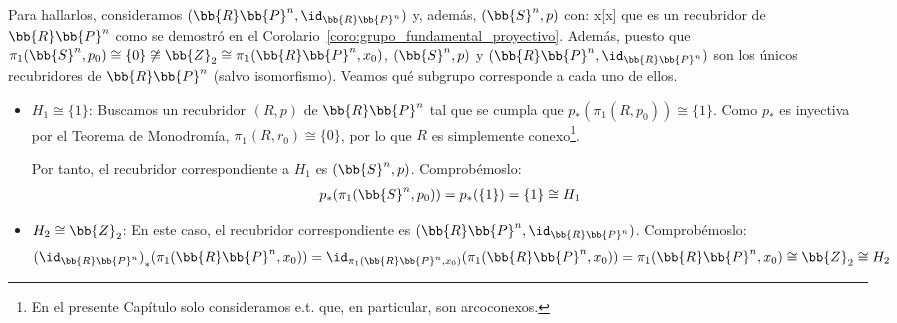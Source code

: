 \begin{ejemplo}
\begin{enumerate}
        Para hallarlos, consideramos $(\bb{R}\bb{P}^n, \id_{\bb{R}\bb{P}^n})$ y, además, $(\bb{S}^n, p)$ con:
            {x}{[x]}
        que es un recubridor de $\bb{R}\bb{P}^n$ como se demostró en el Corolario~\ref{coro:grupo_fundamental_proyectivo}. Además, puesto que $\pi_1(\bb{S}^n, p_0) \cong \{0\}\not\cong \bb{Z}_2\cong \pi_1(\bb{R}\bb{P}^n, x_0)$, $(\bb{S}^n, p)$ y $(\bb{R}\bb{P}^n, \id_{\bb{R}\bb{P}^n})$ son los únicos recubridores de $\bb{R}\bb{P}^n$ (salvo isomorfismo). Veamos qué subgrupo corresponde a cada uno de ellos.
        
        \begin{itemize}
            \item \ul{$H_1\cong \{1\}$}: Buscamos un recubridor $(R,p)$ de $\bb{R}\bb{P}^n$ tal que se cumpla que $p_*(\pi_1(R,p_0)) \cong \{1\}$. Como $p_*$ es inyectiva por el Teorema de Monodromía, $\pi_1(R,r_0) \cong \{0\}$, por lo que $R$ es simplemente conexo\footnote{En el presente Capítulo solo consideramos e.t. que, en particular, son arcoconexos.}.
            
            Por tanto, el recubridor correspondiente a $H_1$ es $(\bb{S}^n, p)$. Comprobémoslo:
            \begin{gather*}
                p_*(\pi_1(\bb{S}^n, p_0)) = p_*(\{1\}) = \{1\} \cong H_1
            \end{gather*}

            \begin{center}
            \end{center}
            
            \item \ul{$H_2\cong \bb{Z}_2$}: En este caso, el recubridor correspondiente es $(\bb{R}\bb{P}^n, \id_{\bb{R}\bb{P}^n})$. Comprobémoslo:
            \begin{gather*}
                {(\id_{\bb{R}\bb{P}^n})}_*(\pi_1(\bb{R}\bb{P}^n, x_0)) = \id_{\pi_1(\bb{R}\bb{P}^n, x_0)}(\pi_1(\bb{R}\bb{P}^n, x_0)) = \pi_1(\bb{R}\bb{P}^n, x_0) \cong \bb{Z}_2 \cong H_2
            \end{gather*}

            \begin{center}
            \end{center}
        \end{itemize}



\end{enumerate}
\end{ejemplo}
